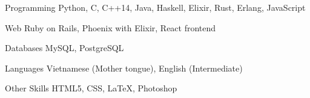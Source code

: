 


\begin{cvskills}


\cvskill
{Programming} %
{Python, C, C++14, Java, Haskell, Elixir, Rust, Erlang, JavaScript} %


\cvskill
{Web} %
{Ruby on Rails, Phoenix with Elixir, React frontend} %

\cvskill
{Databases} %
{MySQL, PostgreSQL} %


\cvskill
{Languages} %
{Vietnamese (Mother tongue), English (Intermediate)} %


\cvskill
{Other Skills} %
{HTML5, CSS, LaTeX, Photoshop}%


\end{cvskills}
